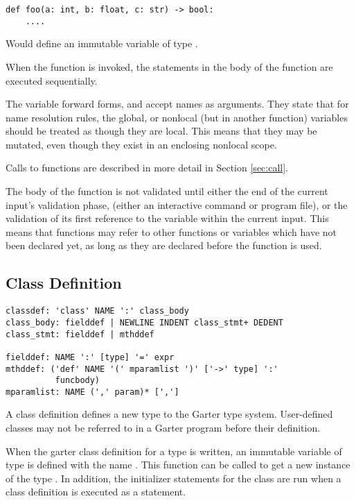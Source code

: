 \begin{lstlisting}
def foo(a: int, b: float, c: str) -> bool:
    ....
\end{lstlisting}

Would define an immutable variable of type .

When the function is invoked, the statements in the body of the function are executed
sequentially.

The variable forward forms,  and  accept names as
arguments. They state that for name resolution rules, the global, or nonlocal (but in
another function) variables should be treated as though they are local. This means that
they may be mutated, even though they exist in an enclosing nonlocal scope.

Calls to functions are described in more detail in Section \ref{sec:call}.

The body of the function is not validated until either the end of the current
input's validation phase, (either an interactive command or program file), or
the validation of its first reference to the variable within the current input.
This means that functions may refer to other functions or variables which have
not been declared yet, as long as they are declared before the function is used.

\subsection{Class Definition}
\label{sec:classdef}

\begin{lstlisting}
classdef: 'class' NAME ':' class_body
class_body: fielddef | NEWLINE INDENT class_stmt+ DEDENT
class_stmt: fielddef | mthddef

fielddef: NAME ':' [type] '=' expr
mthddef: ('def' NAME '(' mparamlist ')' ['->' type] ':'
          funcbody)
mparamlist: NAME (',' param)* [',']
\end{lstlisting}

A class definition defines a new type to the Garter type system. User-defined
classes may not be referred to in a Garter program before their definition.

When the garter class definition for a type  is written, an immutable
variable of type  is defined with the name . This function can
be called to get a new instance of the type . In addition, the
initializer statements for the class are run when a class definition is executed
as a statement.


